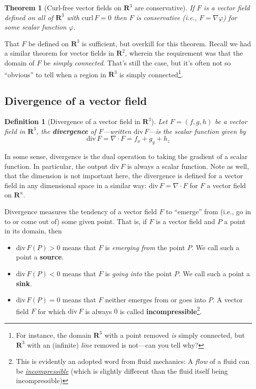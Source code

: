 \documentclass[12pt]{article}
\numberwithin{equation}{subsection}
\numberwithin{figure}{subsection}
\newtheorem{thm}[subsection]{Theorem}
\newtheorem{defn}[subsection]{Definition}
\theoremstyle{note}
\newcommand{\curl}{\mathrm{curl\,}}
\newcommand{\dv}{\mathrm{div\,}}
\begin{document}
{\begin{thm}[Curl-free vector fields on $\mathbf{R}^3$ are conservative] If $F$ is a vector field defined on all of $\mathbf{R}^3$ with $\curl F=0$ then $F$ is conservative (i.e., $F=\nabla \varphi$) for some scalar function $\varphi$. 
\end{thm}
That $F$ be defined on $\mathbf{R}^3$ is sufficient, but overkill for this theorem. Recall we had a similar theorem for vector fields in $\mathbf{R}^2$, wherein the requirement was that the domain of $F$ be \textit{simply connected}. That's still the case, but it's often not so ``obvious'' to tell when a region in $\mathbf{R}^3$ is simply connected\footnote{For instance, the domain $\mathbf{R}^3$ with a point removed \textit{is} simply connected, but $\mathbf{R}^3$ with an (infinite) \textit{line} removed is not---can you tell why?}.


\subsection{Divergence of a vector field}
\begin{defn}[Divergence of a vector field in $\mathbf{R}^3$] Let $F=(f,g,h)$ be a vector field in $\mathbf{R}^3$, the \textbf{divergence} of $F$---written $\dv F$---is the scalar function given by \begin{equation} \label{div} \dv F =\nabla \cdot F= f_x+g_y+h_z \end{equation}
\end{defn}

In some sense, divergence is the dual operation to taking the gradient of a scalar function. In particular, the output $\dv F$ is always a scalar function. Note as well, that the dimension is not important here, the  divergence is defined for a vector field in any dimensional space in a similar way: $\dv F=\nabla \cdot F$ for $F$ a vector field on $\mathbf{R}^n$. 


Divergence measures the tendency of a vector field $F$ to ``emerge'' from (i.e., go in to or come out of) some given point. That is, if $F$ is a vector field and $P$ a point in its domain, then\begin{itemize}
	\item $\dv F(P)>0$ means that $F$ is \textit{emerging from} the point $P$. We  call such a  point a \textbf{source}.
	\item $\dv F(P)<0$ means that $F$ is \textit{going into} the point $P$. We  call such a point a  \textbf{sink}.
	\item $\dv F(P)=0$ means that $F$ neither emerges from or goes into $P$. A vector field $F$ for which $\dv F$ is always $0$  is called \textbf{incompressible}\footnote{This is evidently an adopted word from fluid mechanics: A \textit{flow} of a fluid can be  \href{https://en.wikipedia.org/wiki/Incompressible_flow}{\textit{incompressible}} (which is slightly different than the fluid itself being incompressible)}. 
\end{itemize}

}
\end{document}
